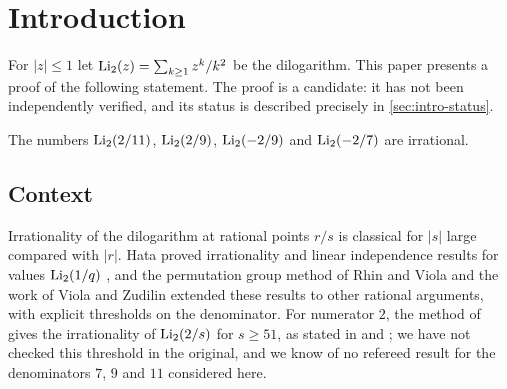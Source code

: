 \section{Introduction}\label{sec:introduction}

For $|z|\le 1$ let $\operatorname{Li}_2(z)=\sum_{k\ge1}z^k/k^2$ be the dilogarithm. This paper presents a proof of the following statement. The proof is a candidate: it has not been independently verified, and its status is described precisely in \cref{sec:intro-status}.

\begin{theorem}\label{thm:main}
The numbers $\operatorname{Li}_2(2/11)$, $\operatorname{Li}_2(2/9)$, $\operatorname{Li}_2(-2/9)$ and $\operatorname{Li}_2(-2/7)$ are irrational.
\end{theorem}

\subsection{Context}\label{sec:intro-context}
Irrationality of the dilogarithm at rational points $r/s$ is classical for $|s|$ large compared with $|r|$. Hata proved irrationality and linear independence results for values $\operatorname{Li}_2(1/q)$ \cite{Hata1990,Hata1993}, and the permutation group method of Rhin and Viola \cite{RhinViola2005,RhinViola2019} and the work of Viola and Zudilin \cite{ViolaZudilin2018} extended these results to other rational arguments, with explicit thresholds on the denominator. For numerator $2$, the method of \cite{RhinViola2005} gives the irrationality of $\operatorname{Li}_2(2/s)$ for $s\ge51$, as stated in \cite[Section~1]{TanZhang2026} and \cite[Section~1.2]{Litsey2026Li2}; we have not checked this threshold in the original, and we know of no refereed result for the denominators $7$, $9$ and $11$ considered here.

